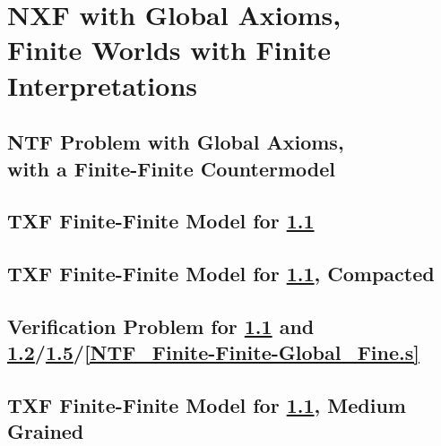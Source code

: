 \documentclass{easychair}
\begin{document}
\newpage
\section{NXF with Global Axioms, \\
         Finite Worlds with Finite Interpretations}
\label{NXFGlobal}

\subsection{NTF Problem with Global Axioms, \\ with a Finite-Finite Countermodel}
\label{NTF_Finite-Finite-Global.p}
\begin{small}

\end{small}

\newpage
\subsection{TXF Finite-Finite Model for \ref{NTF_Finite-Finite-Global.p}}
\label{NTF_Finite-Finite-Global.s}
\begin{small}

\end{small}

\newpage
\subsection{TXF Finite-Finite Model for \ref{NTF_Finite-Finite-Global.p}, Compacted}
\label{NTF_Finite-Finite-Global_Compact.s}
\begin{small}

\end{small}

\newpage
\subsection{Verification Problem for \ref{NTF_Finite-Finite-Global.p} and 
\ref{NTF_Finite-Finite-Global.s}/\ref{NTF_Finite-Finite-Global_Medium.s}/\ref{NTF_Finite-Finite-Global_Fine.s}}
\label{NTF_Finite-Finite-Global.s.p}
\begin{small}

\end{small}

\newpage
\subsection{TXF Finite-Finite Model for \ref{NTF_Finite-Finite-Global.p}, Medium Grained}
\label{NTF_Finite-Finite-Global_Medium.s}
\begin{small}

\end{small}
\end{document}
